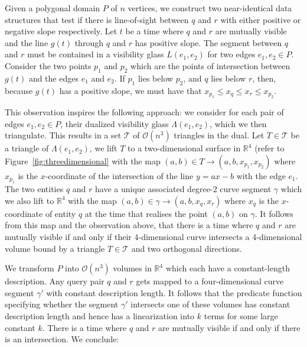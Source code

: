 \documentclass[UKenglish]{lipics-v2019}
\newcommand{\myremark}[4]{\textcolor{blue}{\textsc{#1 #2:}} \textcolor{#4}{\textsf{#3}}}
\newcommand{\patrick}[2][says]{\myremark{Patrick}{#1}{#2}{Plum}}
\renewcommand{\myremark}[4]{}
\begin{document}
Given a polygonal domain $P$ of $n$ vertices, we construct two near-identical data structures that test if there is line-of-sight between $q$ and $r$ with either positive or negative slope respectively. Let $t$ be a time where $q$ and $r$ are mutually visible and the line $g(t)$ through $q$ and $r$ has positive slope. The segment between $q$ and $r$ must be contained in a visibility glass $L(e_1, e_2)$ for two edges $e_1, e_2 \in P$. Consider the two points $p_1$ and $p_2$ which are the points of intersection between $g(t)$ and the edges $e_1$ and $e_2$. If $p_1$ lies below $p_2$, and $q$ lies below $r$, \patrick{I would phrase this as inequalities in $y$ instead of saying "below"} then, because $g(t)$ has a positive slope, we must have that $x_{p_1} \le x_{q} \le x_{r} \le x_{p_2}$.


This observation inspires the following approach: we consider for each pair of edges $e_1, e_2 \in P$, their dualized visibility glass $\Lambda(e_1,e_2)$, which we then triangulate. This results in a set $\mathcal{T}$ of $\mathcal{O}(n^3)$ triangles in the dual. Let $T \in \mathcal{T}$ be a triangle of $\Lambda(e_1, e_2)$, we lift $T$ to a two-dimensional surface in $\mathbb{R}^4$ (refer to Figure~\ref{fig:threedimensional} with the map $(a,b) \in T \rightarrow (a, b, x_{p_1}, x_{p_2})$ where $x_{p_1}$ is the $x$-coordinate of the intersection of the line $y = ax-b$ with the edge $e_1$. The two entities $q$ and $r$ have a unique associated degree-2 curve segment $\gamma$ which we also lift to $\mathbb{R}^4$ with the map $(a,b) \in \gamma \rightarrow (a,b, x_{q}, x_{r})$ where $x_q$ is the $x$-coordinate of entity $q$ at the time that realises the point $(a,b)$ on $\gamma$. It follows from this map and the observation above, that there is a time where $q$ and $r$ are mutually visible if and only if their $4$-dimensional curve intersects a 4-dimensional volume bound by a triangle $T \in \mathcal{T}$ and two orthogonal directions.

We transform $P$ into $\mathcal{O}(n^3)$ volumes in $\mathbb{R}^4$ which each have a constant-length description. Any query pair $q$ and $r$ gets mapped to a four-dimensional curve segment $\gamma'$ with constant description length. It follows that the predicate function specifying whether the segment $\gamma'$ intersects one of these volumes has constant description length and hence has a linearization into $k$ terms for some large constant $k$. There is a time where $q$ and $r$ are mutually visible if and only if there is an intersection.
We conclude:
\end{document}
